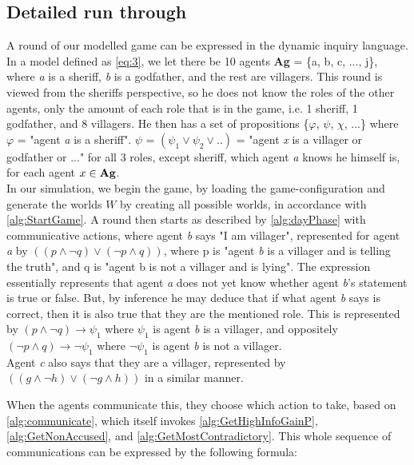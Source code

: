 \subsection{Detailed run through}\label{sec:ARoundOfTheGame}
A round of our modelled game can be expressed in the dynamic inquiry language.
In a model defined as \cref{eq:3}, we let there be 10 agents \textbf{Ag} = \{a,
b, c, ..., j\}, where \textit{a} is a sheriff, \textit{b} is a godfather, and
the rest are villagers. This round is viewed from the sheriffs perspective, so
he does not know the roles of the other agents, only the amount of each role
that is in the game, i.e. 1 sheriff, 1 godfather, and 8 villagers. He then has
a set of propositions \{$\varphi$, $\psi$, $\chi$, $...$\} where $\varphi$ =
"agent \textit{a} is a sheriff". $\psi$ = $(\psi_1 \lor \psi_2 \lor .. )$ = "agent
\textit{x} is a villager or godfather or ..." for all 3 roles, except sheriff,
which agent \textit{a} knows he himself is, for each agent $x \in \text{\textbf{Ag}}$. \\ In our simulation, we begin the game, by
loading the game-configuration and generate the worlds $W$ by creating all
possible worlds, in accordance with \cref{alg:StartGame}. A round then starts
as described by \cref{alg:dayPhase} with communicative actions, where agent
\textit{b} says "I am villager", represented for agent \textit{a} by $((p \land
	\neg q) \lor (\neg p \land q))$, where p is "agent \textit{b} is a villager and
is telling the truth", and q is "agent b is not a villager and is lying". The
expression essentially represents that agent \textit{a} does not yet know
whether agent \textit{b}'s statement is true or false. But, by inference he may
deduce that if what agent \textit{b} says is correct, then it is also true that
they are the mentioned role. This is represented by $(p \land \neg q)
	\rightarrow \psi_1$ where $\psi_1$ is agent \textit{b} is a villager, and
oppositely $(\neg p \land q) \rightarrow \neg \psi_1$ where $\neg \psi_1$ is
agent \textit{b} is not a villager. \\ Agent \textit{c} also says that they are
a villager, represented by $((g \land \neg h) \lor (\neg g \land h))$ in a
similar manner.

When the agents communicate this, they choose which action to take, based on
\cref{alg:communicate}, which itself invokes \cref{alg:GetHighInfoGainP},
\cref{alg:GetNonAccused}, and \cref{alg:GetMostContradictory}. This whole
sequence of communications can be expressed by the following formula:

